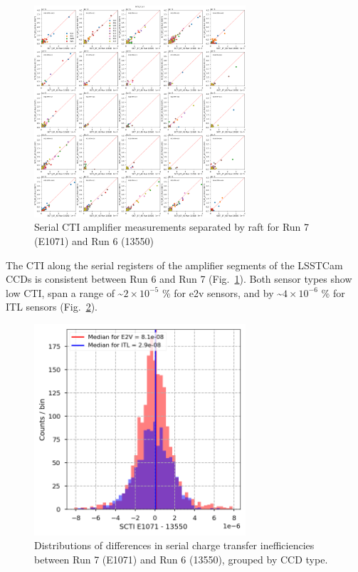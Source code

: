 \begin{figure}[ht]
\begin{centering}
\includegraphics[width=0.7\textwidth]{figures/baselineCharacterization/13550_E1071_SCTI_EF_43_inset.png}
	\caption{Serial CTI amplifier measurements separated by raft for Run 7 (E1071) and Run 6 (13550)\label{fig:serial-cti}}
\end{centering}
\end{figure}

The CTI along the serial registers of the amplifier segments of the LSSTCam CCDs is consistent between Run 6 and
Run 7 (Fig.~\ref{fig:serial-cti}). Both sensor types show low CTI,
span a range  of \textasciitilde$2 \times 10^{-5}$ \% for e2v sensors, and
by \textasciitilde$4 \times 10^{-6}$  \% for ITL sensors (Fig.~\ref{fig:serial-cti-dist}). 

\begin{figure}[ht]
\begin{centering}
\includegraphics[width=0.7\textwidth]{figures/baselineCharacterization/SCTI_13550_E1071_diff.png}
\caption{Distributions of differences in serial charge transfer inefficiencies between Run 7 (E1071) and Run 6 (13550), grouped by CCD type.}
\label{fig:serial-cti-dist}
\end{centering}
\end{figure}

